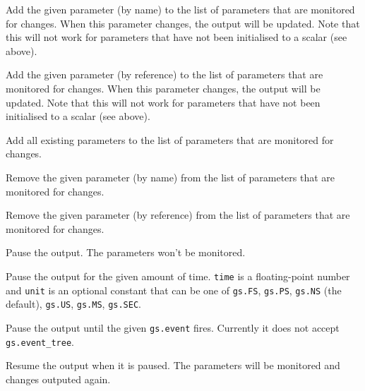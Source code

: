 \documentclass[12pt,oneside]{gsbook}
\begin{document}
\begin{methods}

 {Add the given parameter (by name) to the
list of parameters that are monitored for changes.  When this
parameter changes, the output will be updated.  Note that this will not
work for parameters that have not been initialised to a scalar (see above).}

 {Add the given parameter (by reference) to
the list of parameters that are monitored for changes.  When this
parameter changes, the output will be updated.  Note that this will not
work for parameters that have not been initialised to a scalar (see above).}

 {Add all existing parameters to the list of
parameters that are monitored for changes.}

 {Remove the given parameter (by name)
from the list of parameters that are monitored for changes.}

 {Remove the given parameter (by
reference) from the list of parameters that are monitored for
changes.}

 {Pause the output. The parameters won't be
monitored.}

 {Pause the output for the given amount of
time. \texttt{time} is a floating-point number and \texttt{unit} is an
optional constant that can be one of \texttt{gs.FS},
\texttt{gs.PS}, \texttt{gs.NS} (the default),
\texttt{gs.US}, \texttt{gs.MS}, \texttt{gs.SEC}.}

 {Pause the output until the given
\texttt{gs.event} fires. Currently it does not accept
\texttt{gs.event\_tree}.}

 {Resume the output when it is paused. The
parameters will be monitored and changes outputed again.}

\end{methods}
\end{document}

